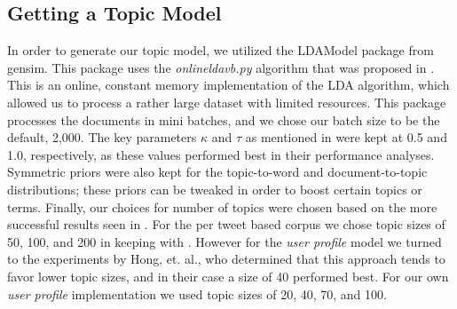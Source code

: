 \documentclass{acm_proc_article-sp}
\begin{document}
\subsection{Getting a Topic Model}
\hspace*{5mm}In order to generate our topic model, we utilized the LDAModel package from gensim. This package uses the \textit{onlineldavb.py} algorithm that was proposed in \cite{hoffman2010online}. This is an online, constant memory implementation of the LDA algorithm, which allowed us to process a rather large dataset with limited resources. This package processes the documents in mini batches, and we chose our batch size to be the default, 2,000. The key parameters $\kappa$ and $\tau$ as mentioned in \cite{hoffman2010online} were kept at 0.5 and 1.0, respectively, as these values performed best in their performance analyses. Symmetric priors were also kept for the topic-to-word and document-to-topic distributions; these priors can be tweaked in order to boost certain topics or terms. Finally, our choices for number of topics were chosen based on the more successful results seen in \cite{hong2010empirical}. For the per tweet based corpus we chose topic sizes of 50, 100, and 200 in keeping with \cite{godin2013using}. However for the \textit{user profile} model we turned to the experiments by Hong, et. al., who determined that this approach tends to favor lower topic sizes, and in their case a size of 40 performed best. For our own \textit{user profile} implementation we used topic sizes of 20, 40, 70, and 100.\\ 
\end{document}
